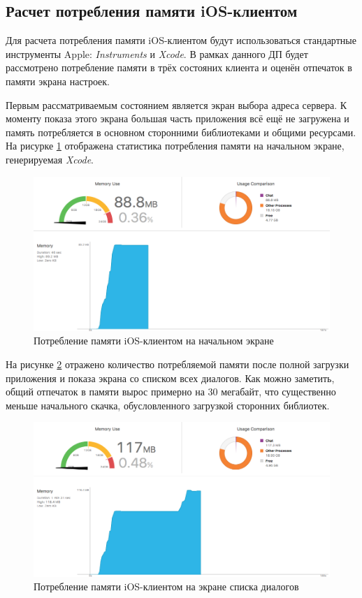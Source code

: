 \subsection{Расчет потребления памяти iOS-клиентом}
\label{sec:eng:memory}

Для расчета потребления памяти iOS-клиентом будут использоваться стандартные инструменты Apple: \textit{Instruments} и \textit{Xcode}. В рамках данного ДП будет рассмотрено потребление памяти в трёх состояних клиента и оценён отпечаток в памяти экрана настроек.

Первым рассматриваемым состоянием является экран выбора адреса сервера. К моменту показа этого экрана большая часть приложения всё ещё не загружена и память потребляется в основном сторонними библиотеками и общими ресурсами. На рисурке \ref{sec:eng:memory:initial} отображена статистика потребления памяти на начальном экране, генерируемая \textit{Xcode}.

\begin{figure}[h]
  \centering
    \includegraphics[width=1\textwidth]{inc/img/memory_initial.png}
  \caption{Потребление памяти iOS-клиентом на начальном экране}
  \label{sec:eng:memory:initial}
\end{figure}

На рисунке \ref{sec:eng:memory:used} отражено количество потребляемой памяти после полной загрузки приложения и показа экрана со списком всех диалогов. Как можно заметить, общий отпечаток в памяти вырос примерно на 30 мегабайт, что существенно меньше начального скачка, обусловленного загрузкой сторонних библиотек.

\begin{figure}[h]
  \centering
    \includegraphics[width=1\textwidth]{inc/img/memory_used.png}
  \caption{Потребление памяти iOS-клиентом на экране списка диалогов}
  \label{sec:eng:memory:used}
\end{figure}

